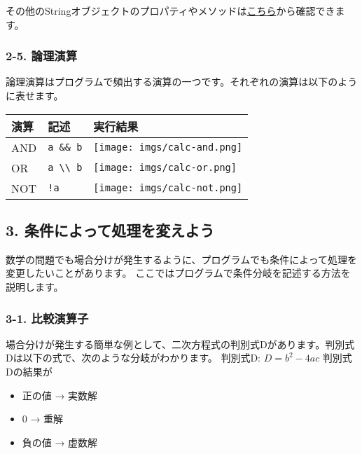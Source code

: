 その他のStringオブジェクトのプロパティやメソッドは\href{https://developer.mozilla.org/ja/docs/Web/JavaScript/Reference/Global_Objects/String}{こちら}から確認できます。

\subsubsection{2-5. 論理演算}\label{ux8ad6ux7406ux6f14ux7b97}

論理演算はプログラムで頻出する演算の一つです。それぞれの演算は以下のように表せます。

\begin{longtable}[]{@{}lll@{}}
\toprule\noalign{}
演算 & 記述 & 実行結果 \\
\midrule\noalign{}
\endhead
\bottomrule\noalign{}
\endlastfoot
AND & \texttt{a\ \&\&\ b} & \texttt{[image: imgs/calc-and.png]} \\
OR & \texttt{a\ \textbackslash{}\textbar{}\textbackslash{}\textbar{}\ b}
& \texttt{[image: imgs/calc-or.png]} \\
NOT & \texttt{!a} & \texttt{[image: imgs/calc-not.png]} \\
\end{longtable}

\subsection{3.
条件によって処理を変えよう}\label{ux6761ux4ef6ux306bux3088ux3063ux3066ux51e6ux7406ux3092ux5909ux3048ux3088ux3046}

数学の問題でも場合分けが発生するように、プログラムでも条件によって処理を変更したいことがあります。
ここではプログラムで条件分岐を記述する方法を説明します。

\subsubsection{3-1. 比較演算子}\label{ux6bd4ux8f03ux6f14ux7b97ux5b50}

場合分けが発生する簡単な例として、二次方程式の判別式Dがあります。判別式Dは以下の式で、次のような分岐がわかります。
判別式D: \(D = b^2 - 4ac\) 判別式Dの結果が

\begin{itemize}
\tightlist
\item
  正の値 → 実数解
\item
  0 → 重解
\item
  負の値 → 虚数解
\end{itemize}

